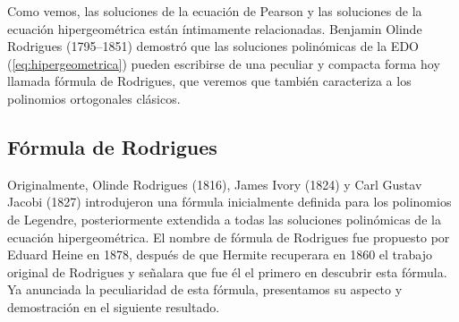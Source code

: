 
Como vemos, las soluciones de la ecuación de Pearson y las soluciones de la ecuación hipergeométrica están íntimamente relacionadas. Benjamin Olinde Rodrigues (1795--1851) demostró que las soluciones polinómicas de la EDO (\ref{eq:hipergeometrica}) pueden escribirse de una peculiar y compacta forma hoy llamada fórmula de Rodrigues, que veremos que también caracteriza a los polinomios ortogonales clásicos.

\subsection{Fórmula de Rodrigues}
\label{subsection:Rodrigues}

Originalmente, Olinde Rodrigues (1816), James Ivory (1824) y Carl Gustav Jacobi (1827) introdujeron una fórmula inicialmente definida para los polinomios de Legendre, posteriormente extendida a todas las soluciones polinómicas de la ecuación hipergeométrica. El nombre de fórmula de Rodrigues fue propuesto por Eduard Heine en 1878, después de que Hermite recuperara en 1860 el trabajo original de Rodrigues y señalara que fue él el primero en descubrir esta fórmula. Ya anunciada la peculiaridad de esta fórmula, presentamos su aspecto y demostración en el siguiente resultado.

